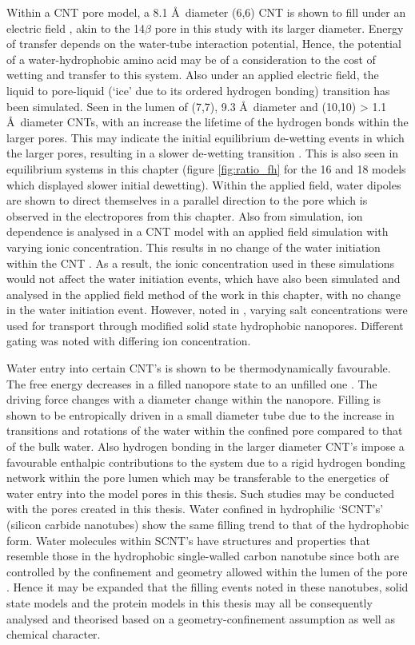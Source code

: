 Within a CNT pore model, a 8.1 \AA\ diameter (6,6) CNT is shown to fill under an electric field \cite{Vaitheeswaran2004f}, akin to the 14$\beta$ pore in this study with its larger diameter. Energy of transfer depends on the water-tube interaction potential, Hence, the potential of a water-hydrophobic amino acid may be of a consideration to the cost of wetting and transfer to this system. Also under an applied electric field, the liquid to pore-liquid (`ice' due to its ordered hydrogen bonding) transition has been simulated. Seen in the lumen of (7,7), 9.3 \AA\ diameter and (10,10) > 1.1 \AA\ diameter CNTs,  with an increase the lifetime of the hydrogen bonds within the larger pores. This may indicate the initial equilibrium de-wetting events in which the larger pores, resulting in a slower de-wetting transition \cite{Winarto2015}. This is also seen in equilibrium systems in this chapter (figure \ref{fig:ratio_fh} for the 16 and 18 models which displayed slower initial dewetting). Within the applied field, water dipoles are shown to direct themselves in a parallel direction to the pore which is observed in the electropores from this chapter. Also from simulation, ion dependence is analysed in a CNT model with an applied field simulation with varying ionic concentration. This results in no change of the water initiation within the CNT \cite{Kofinger2008}. As a result, the ionic concentration used in these simulations would not affect the water initiation events, which have also been simulated and analysed in the applied field method of the work in this chapter, with no change in the water initiation event. However, noted in \cite{Innes2015}, varying salt concentrations were used for transport through modified solid state hydrophobic nanopores. Different gating was noted with differing ion concentration.
 
Water entry into certain CNT's is shown to be thermodynamically favourable. The free energy decreases in a filled nanopore state to an unfilled one \cite{Lu2004,Pascal2011}. The driving force changes with a diameter change within the nanopore. Filling is shown to be entropically driven in a small diameter tube due to the increase in transitions and rotations of the water within the confined pore compared to that of the bulk water.  Also hydrogen bonding in the larger diameter CNT's impose a favourable enthalpic contributions to the system due to a rigid hydrogen bonding network within the pore lumen which may be transferable to the energetics of water entry into the model pores in this thesis. Such studies may be conducted with the pores created in this thesis. Water confined in hydrophilic `SCNT's' (silicon carbide nanotubes) show the same filling trend to that of the hydrophobic form. Water molecules within SCNT's have structures and properties that resemble those in the hydrophobic single-walled carbon nanotube since both are controlled by the confinement and geometry allowed within the lumen of the pore \cite{Yang2011}. Hence it may be expanded that the filling events noted in these nanotubes, solid state models and the protein models in this thesis may all be consequently analysed and theorised based on a geometry-confinement assumption as well as chemical character. 

